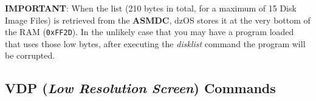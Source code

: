 \documentclass[a4paper,11pt]{article}
\begin{document}
        \textbf{IMPORTANT}: When the list (210 bytes in total, for a maximum of
        15 Disk Image Files) is retrieved from the \textbf{ASMDC}, dzOS stores
        it at the very bottom of the RAM (\texttt{0xFF2D}). In the unlikely case
        that you may have a program loaded that uses those low bytes, after
        executing the \textit{disklist} command the program will be corrupted.


        
        

        



        

    \subsection{VDP (\textit{Low Resolution Screen}) Commands}\label{vdpcmds}
\end{document}
